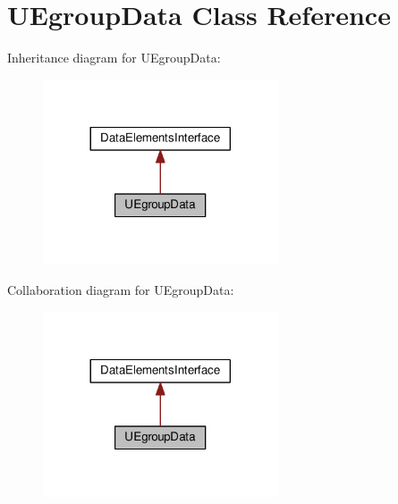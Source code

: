 \hypertarget{class_u_egroup_data}{}\section{U\+Egroup\+Data Class Reference}
\label{class_u_egroup_data}


Inheritance diagram for U\+Egroup\+Data\+:
\nopagebreak
\begin{figure}[H]
\begin{center}
\leavevmode
\includegraphics[width=197pt]{class_u_egroup_data__inherit__graph}
\end{center}
\end{figure}


Collaboration diagram for U\+Egroup\+Data\+:
\nopagebreak
\begin{figure}[H]
\begin{center}
\leavevmode
\includegraphics[width=197pt]{class_u_egroup_data__coll__graph}
\end{center}
\end{figure}
